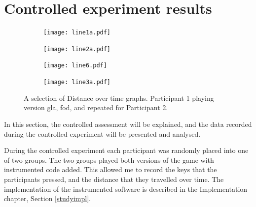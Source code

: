\documentclass[12pt,a4paper,twoside,openright]{report}
\begin{document}
\section{Controlled experiment results}
\label{expResults}


\begin{figure}[htb!]
    \centering
    \begin{subfigure}[t]{1\textwidth}
        \centering
        \texttt{[image: line1a.pdf]}
        \label{line1}
    \end{subfigure}
    \begin{subfigure}[t]{1\textwidth}
        \centering
        \texttt{[image: line2a.pdf]}
        \label{line2}
    \end{subfigure}
    \begin{subfigure}[t]{1\textwidth}
        \centering
        \texttt{[image: line6.pdf]}
        \label{line3}
    \end{subfigure}
    \begin{subfigure}[t]{1\textwidth}
        \centering
        \texttt{[image: line3a.pdf]}
        \label{line4}
    \end{subfigure}
    \caption{A selection of Distance over time graphs. Participant 1 playing version gla, fod, and repeated for Participant 2.}
    \label{assorted}
\end{figure}


In this section, the controlled assessment will be explained, and the data recorded during the controlled experiment will be presented and analysed.

During the controlled experiment each participant was randomly placed into one of two groups.
The two groups played both versions of the game with instrumented code added. This allowed me to record the keys that the participants pressed, and the distance that they travelled over time. The implementation of the instrumented software is described in the Implementation chapter, Section \ref{studyimpl}.
\end{document}
